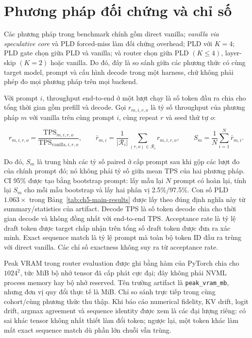 \section{Phương pháp đối chứng và chỉ số}

Các phương pháp trong benchmark chính gồm direct vanilla; \textit{vanilla via speculative core} và PLD forced-miss làm đối chứng overhead; PLD với \(K=4\); PLD gate chọn giữa PLD và vanilla; và router chọn giữa PLD \((K\leq4)\), layer-skip \((K=2)\) hoặc vanilla. Do đó, đây là so sánh giữa các phương thức có cùng target model, prompt và cấu hình decode trong một harness, chứ không phải phép đo mọi phương pháp trên mọi backend.

Với prompt \(i\), throughput end-to-end ở một lượt chạy là số token đầu ra chia cho tổng thời gian gồm prefill và decode. Gọi \(r_{m,i,r,o}\) là tỷ số throughput của phương pháp \(m\) với vanilla trên cùng prompt \(i\), cùng repeat \(r\) và seed thứ tự \(o\):

\begin{equation}
r_{m,i,r,o}=\frac{\mathrm{TPS}_{m,i,r,o}}{\mathrm{TPS}_{\mathrm{vanilla},i,r,o}},\qquad
\bar r_{m,i}=\frac{1}{|\mathcal{R}_i|}\sum_{(r,o)\in\mathcal{R}_i}r_{m,i,r,o},\qquad
S_m=\frac{1}{N}\sum_{i=1}^{N}\bar r_{m,i}.
\label{eq:ch5-paired-speedup}
\end{equation}

Do đó, \(S_m\) là trung bình các tỷ số paired ở cấp prompt sau khi gộp các lượt đo của chính prompt đó; nó không phải tỷ số giữa mean TPS của hai phương pháp. CI 95\% được tạo bằng bootstrap prompt: lấy mẫu lại \(N\) prompt có hoàn lại, tính lại \(S_m\) cho mỗi mẫu bootstrap và lấy hai phân vị 2.5\%/97.5\%. Con số PLD \(1.063\times\) trong Bảng~\ref{tab:ch5-main-results} được lấy theo đúng định nghĩa này từ summary/statistics của artifact. Decode TPS là số token decode chia cho thời gian decode và không đồng nhất với end-to-end TPS. Acceptance rate là tỷ lệ draft token được target chấp nhận trên tổng số draft token được đưa ra xác minh. Exact sequence match là tỷ lệ prompt mà toàn bộ token ID đầu ra trùng với direct vanilla. Các chỉ số exactness không suy ra từ acceptance rate.

Peak VRAM trong router evaluation được ghi bằng hàm  của PyTorch chia cho \(1024^2\), tức MiB bộ nhớ tensor đã cấp phát cực đại; đây không phải NVML process memory hay bộ nhớ reserved. Tên trường artifact là \texttt{peak\_vram\_mb}, nhưng đơn vị quy đổi thực tế là MiB. Chỉ so sánh trực tiếp trong cùng cohort/cùng phương thức thu thập. Khi báo cáo numerical fidelity, KV drift, logit drift, argmax agreement và sequence identity được xem là các đại lượng riêng: có sai khác tensor không nhất thiết làm đổi token; ngược lại, một token khác làm mất exact sequence match dù phần lớn chuỗi vẫn trùng.


